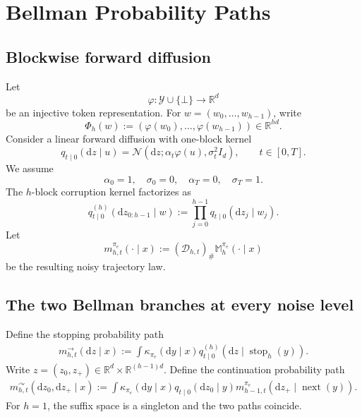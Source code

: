 \documentclass[11pt]{article}
\theoremstyle{definition}
\theoremstyle{remark}
\newcommand{\Yspace}{\mathcal Y}
\newcommand{\Normal}{\mathcal N}
\newcommand{\R}{\mathbb R}
\newcommand{\nextx}{\operatorname{next}}
\newcommand{\stoptraj}{\operatorname{stop}}
\newcommand{\emptytok}{\bot}
\newcommand{\dd}{\mathrm d}
\newcommand{\Diff}{\mathcal D}
\newcommand{\targetpi}{\pi_e}
\newcommand{\branchstop}{\rightarrow}
\newcommand{\branchcont}{\curvearrowright}
\begin{document}
\section{Bellman Probability Paths}
\label{sec:probability-paths}

\subsection{Blockwise forward diffusion}

Let
\begin{equation}
\varphi:
\Yspace\cup\{\emptytok\}
\to
\R^d
\end{equation}
be an injective token representation. For
$w=(w_0,\ldots,w_{h-1})$, write
\begin{equation}
\Phi_h(w)
:=
(\varphi(w_0),\ldots,\varphi(w_{h-1}))
\in\R^{hd}.
\end{equation}
Consider a linear forward diffusion with one-block kernel
\begin{equation}
q_{t\mid0}(\dd z\mid u)
=
\Normal
\left(
\dd z;
\alpha_t\varphi(u),
\sigma_t^2I_d
\right),
\qquad
t\in[0,T].
\label{eq:block-noise}
\end{equation}
We assume
\begin{equation}
\alpha_0=1,
\quad
\sigma_0=0,
\quad
\alpha_T=0,
\quad
\sigma_T=1.
\label{eq:boundary-schedule}
\end{equation}
The $h$-block corruption kernel factorizes as
\begin{equation}
\boxed{
q_{t\mid0}^{(h)}(\dd z_{0:h-1}\mid w)
:=
\prod_{j=0}^{h-1}
q_{t\mid0}(\dd z_j\mid w_j).
}
\label{eq:blockwise-kernel}
\end{equation}
Let
\begin{equation}
m_{h,t}^{\targetpi}(\cdot\mid x)
:=
(\Diff_{h,t})_{\#}
\mathbb M_h^{\targetpi}(\cdot\mid x)
\label{eq:noisy-path-law}
\end{equation}
be the resulting noisy trajectory law.

\subsection{The two Bellman branches at every noise level}

Define the stopping probability path
\begin{equation}
\boxed{
\begin{aligned}
m_{h,t}^{\branchstop}(\dd z\mid x)
:=
\int
\kappa_{\targetpi}(\dd y\mid x)
q_{t\mid0}^{(h)}
(\dd z\mid\stoptraj_h(y)).
\end{aligned}
}
\label{eq:stop-path}
\end{equation}
Write $z=(z_0,z_+)\in\R^d\times\R^{(h-1)d}$. Define the continuation
probability path
\begin{equation}
\boxed{
\begin{aligned}
m_{h,t}^{\branchcont}
(\dd z_0,\dd z_+\mid x)
:=
\int
\kappa_{\targetpi}(\dd y\mid x)
q_{t\mid0}(\dd z_0\mid y)
 m_{h-1,t}^{\targetpi}
(\dd z_+\mid\nextx(y)).
\end{aligned}
}
\label{eq:continue-path}
\end{equation}
For $h=1$, the suffix space is a singleton and the two paths coincide.
\end{document}
